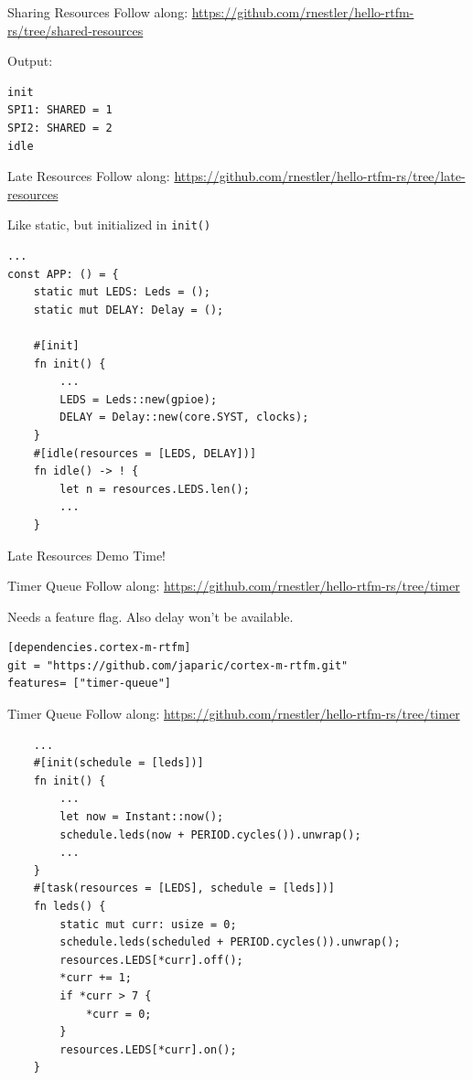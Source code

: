 \documentclass[aspectratio=1610,14pt,t]{beamer}
\begin{document}
\begin{frame}[fragile]{Sharing Resources}
  \small{Follow along: \url{https://github.com/rnestler/hello-rtfm-rs/tree/shared-resources}}

  Output:
  \begin{verbatim}
init
SPI1: SHARED = 1
SPI2: SHARED = 2
idle
  \end{verbatim}
\end{frame}

\begin{frame}[fragile]{Late Resources}
  \small{Follow along: \url{https://github.com/rnestler/hello-rtfm-rs/tree/late-resources}}

  Like static, but initialized in \texttt{init()}

  \begin{verbatim}
...
const APP: () = {
    static mut LEDS: Leds = ();
    static mut DELAY: Delay = ();

    #[init]
    fn init() {
        ...
        LEDS = Leds::new(gpioe);
        DELAY = Delay::new(core.SYST, clocks);
    }
    #[idle(resources = [LEDS, DELAY])]
    fn idle() -> ! {
        let n = resources.LEDS.len();
        ...
    }
  \end{verbatim}
\end{frame}

\begin{frame}[c,fragile]{Late Resources}
  Demo Time!
\end{frame}

\begin{frame}[fragile]{Timer Queue}
  \small{Follow along: \url{https://github.com/rnestler/hello-rtfm-rs/tree/timer}}

  Needs a feature flag. Also delay won't be available.

  \begin{verbatim}
[dependencies.cortex-m-rtfm]
git = "https://github.com/japaric/cortex-m-rtfm.git"
features= ["timer-queue"]
  \end{verbatim}
\end{frame}

\begin{frame}[fragile]{Timer Queue}
  \small{Follow along: \url{https://github.com/rnestler/hello-rtfm-rs/tree/timer}}

  \begin{verbatim}
    ...
    #[init(schedule = [leds])]
    fn init() {
        ...
        let now = Instant::now();
        schedule.leds(now + PERIOD.cycles()).unwrap();
        ...
    }
    #[task(resources = [LEDS], schedule = [leds])]
    fn leds() {
        static mut curr: usize = 0;
        schedule.leds(scheduled + PERIOD.cycles()).unwrap();
        resources.LEDS[*curr].off();
        *curr += 1;
        if *curr > 7 {
            *curr = 0;
        }
        resources.LEDS[*curr].on();
    }
  \end{verbatim}
\end{frame}
\end{document}
